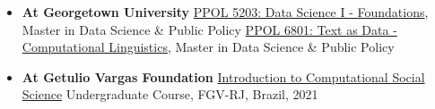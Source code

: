 \documentclass[letterpaper, 11pt]{article}
\begin{document}
    \begin{itemize}[leftmargin=.45cm]
        \item \textbf{At Georgetown University}
             \subitem \href{https://tiagoventura.github.io/ppol5203/}{PPOL 5203: Data Science I - Foundations}, Master in Data Science \& Public Policy
             \subitem \href{https://tiagoventura.github.io/PPOL_6801/}{PPOL 6801: Text as Data - Computational Linguistics}, Master in Data Science \& Public Policy



         \item \textbf{At Getulio Vargas Foundation }
         \subitem \href{https://fgvintrocss.netlify.app/}{Introduction to Computational Social Science} Undergraduate Course, FGV-RJ, Brazil, 2021
    \end{itemize}







\end{document}
